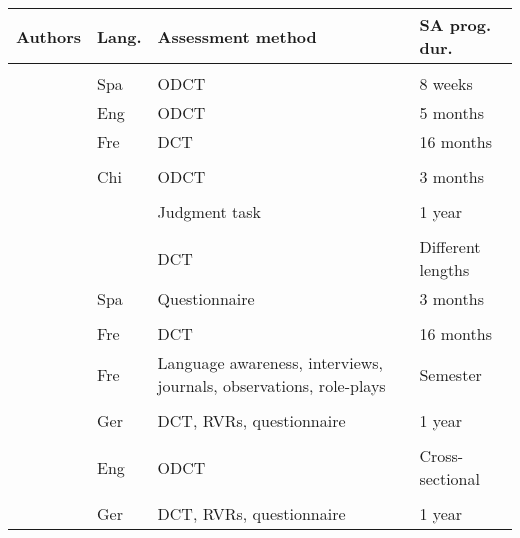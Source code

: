 \documentclass[output=paper]{langscibook}
\begin{document}
    \begin{table}
    \small
    \begin{tabularx}{\textwidth}{>{\raggedright\arraybackslash}p{2.5cm}lQp{2cm}}
        \midrule
        Authors & Lang. & Assessment method & SA prog. dur.\\
        \midrule
		 \\
		\citet{Félix-BrasdeferHasler-Barker2015} & Spa & ODCT & 8 weeks \\
		\citet{Fukasawa2012} 	  & Eng & ODCT & 5 months \\
		\citet{Hoffman-Hicks1999} 		  & Fre  & DCT  & 16 months   \\
    \tablevspace
		 \\
		\citet{TaguchiLi2016} & Chi & ODCT & 3 months \\
    \tablevspace
		 \\
		\citet{Matsumura2001,Matsumura2003} & & Judgment task & 1 year \\
    \tablevspace
		 \\
		\citet{Cheng2005}  & 		 & DCT 			 & Different lengths \\
		\citet{DePablosOrtega2008} & Spa & Questionnaire & 3 months \\
    \tablevspace
		 \\
		\citet{Hoffman-Hicks1999}     & Fre  & DCT 					   & 16 months \\
		\citet{Kinginger2008} & Fre  & Language awareness, interviews, journals, observations, role-plays	   & Semester \\
    \tablevspace
		 \\
		\citet{Barron2003,Barron2007} & Ger & DCT, RVRs, questionnaire    & 1 year \\
    \tablevspace
		 \\
		\citet{Taguchi2011} & Eng & ODCT & Cross-sectional \\
    \tablevspace
		 \\
		\citet{Barron2003,Barron2007}    & Ger  & DCT, RVRs, questionnaire         & 1 year \\
    \end{tabularx}
    \end{table}
\end{document}
